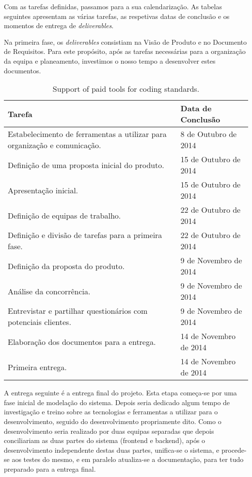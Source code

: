 
Com as tarefas definidas, passamos para a sua calendarização.
As tabelas seguintes apresentam as várias tarefas, as respetivas datas de conclusão e os momentos de entrega de \emph{deliverables}.

Na primeira fase, os \emph{deliverables} consistiam na Visão de Produto e no Documento de Requisitos. Para este propósito, após as tarefas necessárias para a organização da equipa e planeamento, investimos o nosso tempo a desenvolver estes documentos.

\begin{table}[H]\centering
    \begin{tabular}{@{}p{}l@{}}\toprule
    Tarefa & Data de Conclusão \\
    \midrule
    Estabelecimento de ferramentas a utilizar para organização e comunicação.& 8 de Outubro de 2014 \\
    Definição de uma proposta inicial do produto. & 15 de Outubro de 2014 \\
    Apresentação inicial. & 15 de Outubro de 2014 \\
    Definição de equipas de trabalho. & 22 de Outubro de 2014 \\
    Definição e divisão de tarefas para a primeira fase. & 22 de Outubro de 2014 \\
    Definição da proposta do produto. & 9 de Novembro de 2014 \\
    Análise da concorrência. & 9 de Novembro de 2014 \\
    Entrevistar e partilhar questionários com potenciais clientes. & 9 de Novembro de 2014 \\
    Elaboração dos documentos para a entrega. & 14 de Novembro de 2014 \\
    Primeira entrega. & 14 de Novembro de 2014 \\
    \bottomrule
    \end{tabular}
    \caption{Support of paid tools for coding standards.}
    \label{tab:tool_support}
\end{table}

A entrega seguinte é a entrega final do projeto.
Esta etapa começa-se por uma fase inicial de modelação do sistema. Depois seria dedicado algum tempo de investigação e treino sobre as tecnologias e ferramentas a utilizar para o desenvolvimento, seguido do desenvolvimento propriamente dito. Como o desenvolvimento seria realizado por duas equipas separadas que depois conciliariam as duas partes do sistema (frontend e backend), após o desenvolvimento independente destas duas partes, unifica-se o sistema, e procede-se aos testes do mesmo, e em paralelo atualiza-se a documentação, para ter tudo preparado para a entrega final.

